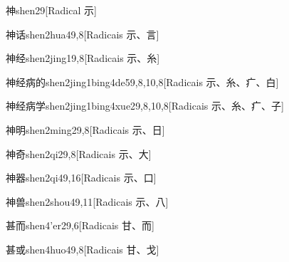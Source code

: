 \begin{entry}{神}{shen2}{9}[Radical ⽰]
\end{entry}

\begin{entry}{神话}{shen2hua4}{9,8}[Radicais ⽰、⾔]
\end{entry}

\begin{entry}{神经}{shen2jing1}{9,8}[Radicais ⽰、⽷]
\end{entry}

\begin{entry}{神经病的}{shen2jing1bing4de5}{9,8,10,8}[Radicais ⽰、⽷、⽧、⽩]
\end{entry}

\begin{entry}{神经病学}{shen2jing1bing4xue2}{9,8,10,8}[Radicais ⽰、⽷、⽧、⼦]
\end{entry}

\begin{entry}{神明}{shen2ming2}{9,8}[Radicais ⽰、⽇]
\end{entry}

\begin{entry}{神奇}{shen2qi2}{9,8}[Radicais ⽰、⼤]
\end{entry}

\begin{entry}{神器}{shen2qi4}{9,16}[Radicais ⽰、⼝]
\end{entry}

\begin{entry}{神兽}{shen2shou4}{9,11}[Radicais ⽰、⼋]
\end{entry}

\begin{entry}{甚而}{shen4'er2}{9,6}[Radicais ⽢、⽽]
\end{entry}

\begin{entry}{甚或}{shen4huo4}{9,8}[Radicais ⽢、⼽]
\end{entry}

